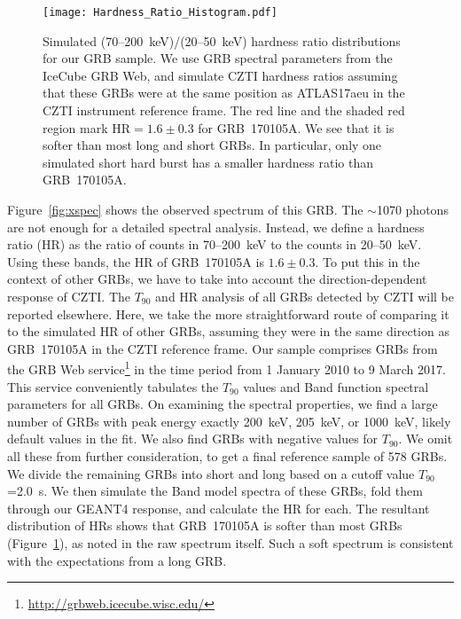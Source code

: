 \documentclass[twocolumn]{aastex6}
\begin{document}
\begin{figure}[bht]
\texttt{[image: Hardness\_Ratio\_Histogram.pdf]}
\caption{Simulated (70--200~keV)/(20--50~keV) hardness ratio distributions for our GRB sample. We use GRB spectral parameters from the IceCube GRB Web, and simulate CZTI hardness ratios assuming that these GRBs were at the same position as ATLAS17aeu in the CZTI instrument reference frame. The red line and the shaded red region mark HR$= 1.6\pm0.3$ for GRB~170105A. We see that it is softer than most long and short GRBs. In particular, only one simulated short hard burst has a smaller hardness ratio than GRB~170105A.}
\label{fig:hardhist}
\end{figure}

Figure~\ref{fig:xspec} shows the observed spectrum of this GRB. The $\sim$1070 photons are not enough for a detailed spectral analysis. Instead, we define a hardness ratio (HR) as the ratio of counts in 70--200~keV to the counts in 20--50~keV. 
Using these bands, the HR of GRB~170105A is $1.6\pm0.3$. To put this in the context of other GRBs, we have to take into account the direction-dependent response of CZTI. The $T_{90}$ and HR analysis of all GRBs detected by CZTI will be reported elsewhere. Here, we take the more straightforward route of comparing it to the simulated HR of other GRBs, assuming they were in the same direction as GRB~170105A in the CZTI reference frame. Our sample comprises GRBs from the GRB Web service\footnote{\url{http://grbweb.icecube.wisc.edu/}} \citep{grbweb} in the time period from 1 January 2010 to 9 March 2017. This service conveniently tabulates the $T_{90}$ values and Band function spectral parameters for all GRBs. On examining the spectral properties, we find a large number of GRBs with peak energy exactly 200~keV, 205~keV, or 1000~keV, likely default values in the fit. We also find GRBs with negative values for $T_{90}$. We omit all these from further consideration, to get a final reference sample of 578 GRBs. We divide the remaining GRBs into short and long based on a cutoff value $T_{90}$=2.0~s. We then simulate the Band model spectra of these GRBs, fold them through our GEANT4 response, and calculate the HR for each. The resultant distribution of HRs shows that GRB~170105A is softer than most GRBs (Figure~\ref{fig:hardhist}), as noted in the raw spectrum itself. Such a soft spectrum is consistent with the expectations from a long GRB.
\end{document}
